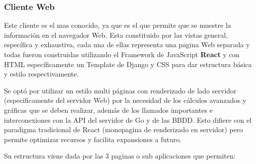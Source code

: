 \subsubsection{Cliente Web}

Este cliente es el mas conocido, ya que es el que permite que se muestre la
información en el navegador Web. Esta constituido por las vistas general,
específica y exhaustiva, cada una de ellas representa una pagina Web separada y
todas fueron construidas utilizando el Framework de JavaScript \textbf{React}
y con HTML específicamente un Template de Django y CSS para dar estructura
básica y estilo respectivamente.

Se optó por utilizar un
estilo multi páginas con renderizado de lado servidor (específicamente del
servidor Web) por la necesidad de los cálculos avanzados y gráficas que
se deben realizar, además de los llamados importantes e interconexiones con la
API del servidor de Go y de las BBDD. Esto difiere con el paradigma tradicional de
React (monopagina de renderizado en servidor) pero permite optimizar recursos y
facilita expansiones a futuro.

Su estructura viene dada por las 3 paginas o sub aplicaciones que permiten:

